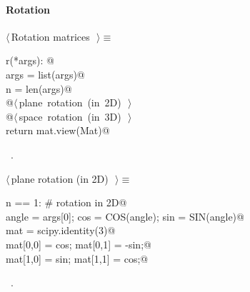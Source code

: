 \documentclass[11pt,oneside]{article}	%
\begin{document}
\paragraph{Rotation}
\begin{flushleft} \small \label{scrap26}
$\langle\,$Rotation matrices\nobreak\ {\footnotesize {}}$\,\rangle\equiv$
\vspace{-1ex}
\begin{list}{}{} \item
\mbox{}\verb@def r(*args): @\\
\mbox{}\verb@   args = list(args)@\\
\mbox{}\verb@   n = len(args)@\\
\mbox{}\verb@   @\hbox{$\langle\,$plane rotation (in 2D)\nobreak\ {\footnotesize {}}$\,\rangle$}\verb@@\\
\mbox{}\verb@   @\hbox{$\langle\,$space rotation (in 3D)\nobreak\ {\footnotesize {}}$\,\rangle$}\verb@@\\
\mbox{}\verb@   return mat.view(Mat)@\\
\mbox{}\verb@@{\NWsep}
\end{list}
\vspace{-1ex}
\footnotesize\addtolength{\baselineskip}{-1ex}
\begin{list}{}{\setlength{\itemsep}{-\parsep}\setlength{\itemindent}{-\leftmargin}}
\item \NWtxtMacroRefIn\ .
\end{list}
\end{flushleft}
\begin{flushleft} \small \label{scrap27}
$\langle\,$plane rotation (in 2D)\nobreak\ {\footnotesize {}}$\,\rangle\equiv$
\vspace{-1ex}
\begin{list}{}{} \item
\mbox{}\verb@if n == 1: # rotation in 2D@\\
\mbox{}\verb@   angle = args[0]; cos = COS(angle); sin = SIN(angle)@\\
\mbox{}\verb@   mat = scipy.identity(3)@\\
\mbox{}\verb@   mat[0,0] = cos;   mat[0,1] = -sin;@\\
\mbox{}\verb@   mat[1,0] = sin;   mat[1,1] = cos;@\\
\mbox{}\verb@@{\NWsep}
\end{list}
\vspace{-1ex}
\footnotesize\addtolength{\baselineskip}{-1ex}
\begin{list}{}{\setlength{\itemsep}{-\parsep}\setlength{\itemindent}{-\leftmargin}}
\item \NWtxtMacroRefIn\ .
\end{list}
\end{flushleft}
\end{document}
